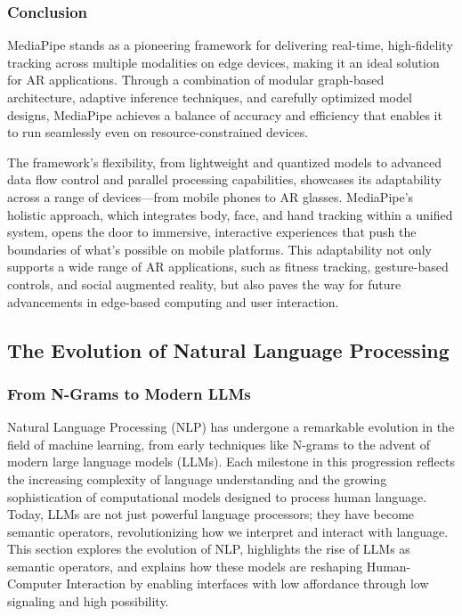\subsubsection{Conclusion}

MediaPipe stands as a pioneering framework for delivering real-time, high-fidelity tracking across multiple modalities on edge devices, making it an ideal solution for AR applications.
Through a combination of modular graph-based architecture, adaptive inference techniques, and carefully optimized model designs, MediaPipe achieves a balance of accuracy and efficiency that enables it to run seamlessly even on resource-constrained devices.

The framework’s flexibility, from lightweight and quantized models to advanced data flow control and parallel processing capabilities, showcases its adaptability across a range of devices—from mobile phones to AR glasses.
MediaPipe’s holistic approach, which integrates body, face, and hand tracking within a unified system, opens the door to immersive, interactive experiences that push the boundaries of what’s possible on mobile platforms.
This adaptability not only supports a wide range of AR applications, such as fitness tracking, gesture-based controls, and social augmented reality, but also paves the way for future advancements in edge-based computing and user interaction.

\subsection{ The Evolution of Natural Language Processing}

\subsubsection{ From N-Grams to Modern LLMs}

Natural Language Processing (NLP) has undergone a remarkable evolution in the field of machine learning, from early techniques like N-grams \cite{Mar13} to the advent of modern large language models (LLMs).
Each milestone in this progression reflects the increasing complexity of language understanding and the growing sophistication of computational models designed to process human language.
Today, LLMs are not just powerful language processors; they have become semantic operators, revolutionizing how we interpret and interact with language.
This section explores the evolution of NLP, highlights the rise of LLMs as semantic operators, and explains how these models are reshaping Human-Computer Interaction by enabling interfaces with low affordance through low signaling and high possibility.

